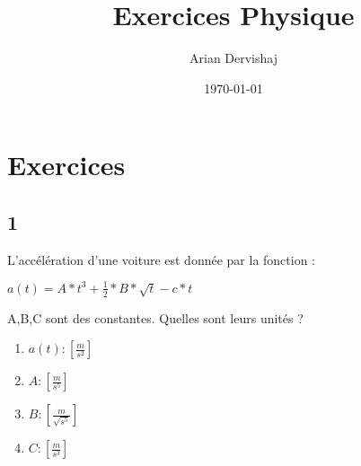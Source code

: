 \documentclass[a4paper, 12pt]{article}
\title{Exercices Physique}
\author{Arian Dervishaj}
\date{\today}
\begin{document}
\setlength{\parindent}{0pt}
\maketitle

\section*{Exercices}

\subsection*{1}
L'accélération d'une voiture est donnée par la fonction :

$a(t) = A*t^{3} + \frac{1}{2} * B * \sqrt{t} - c * t$

A,B,C sont des constantes. Quelles sont leurs unités ?

\begin{enumerate}
    \item $a(t) : [\frac{m}{s^{2}}]$
    \item $ A : [\frac{m}{s^{5}}]$
    \item $B : [\frac{m}{\sqrt{s^{5}}}]$ 
    \item $C : [\frac{m}{s^{3}}]$ 
\end{enumerate}
\end{document}
